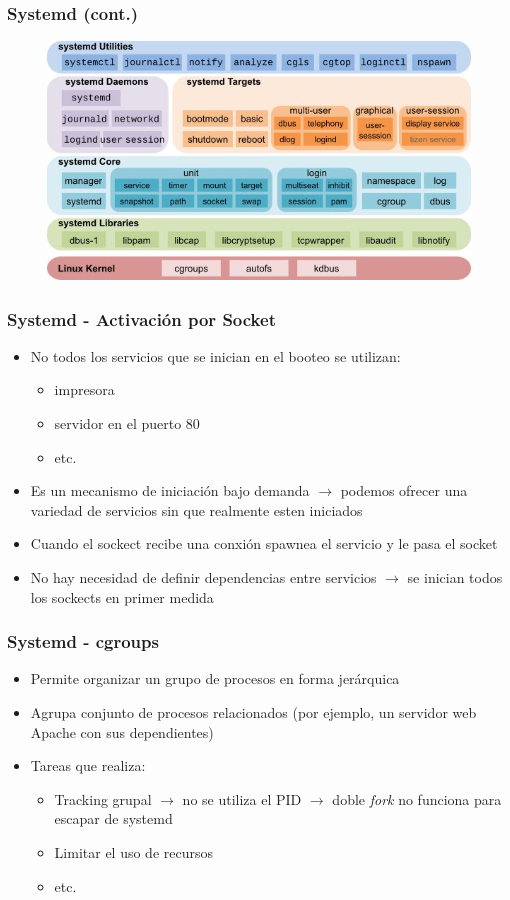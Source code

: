 \begin{frame}
  \frametitle{\textbf{Systemd} (cont.)}
  \begin{figure}
	    \includegraphics[scale=0.5]{images/systemd.jpg}
  \end{figure}
\end{frame}

\begin{frame}
  	\frametitle{\textbf{Systemd} - Activación por Socket}
  	\begin{itemize}
		\item No todos los servicios que se inician en el booteo se utilizan:
		\begin{itemize}
			\item impresora
			\item servidor en el puerto 80
			\item etc.
		\end{itemize}
		\item Es un mecanismo de iniciación bajo demanda $\rightarrow$ podemos ofrecer una variedad de servicios sin que realmente esten iniciados
		\item Cuando el sockect recibe una conxión spawnea el servicio y le pasa el socket
		\item No hay necesidad de definir dependencias entre servicios $\rightarrow$ se inician todos los sockects en primer medida
  	\end{itemize}
\end{frame}

\begin{frame}
  	\frametitle{\textbf{Systemd} - \textbf{cgroups}}
  	\begin{itemize}
		\item Permite organizar un grupo de procesos en forma jerárquica
		\item Agrupa conjunto de procesos relacionados (por ejemplo, un servidor web Apache con sus dependientes)
		\item Tareas que realiza:
		\begin{itemize}
			\item Tracking grupal $\rightarrow$ no se utiliza el PID $\rightarrow$ doble \emph{fork} no funciona para escapar de systemd
			\item Limitar el uso de recursos
			\item etc.
		\end{itemize}
  	\end{itemize}
\end{frame}

